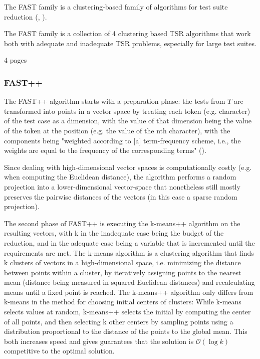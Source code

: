 The FAST family is a clustering-based family of algorithms for test
suite reduction (\cite{miranda2018fast}, \cite{cruciani2019scalable}).

The FAST family is a collection of 4 clustering based TSR algorithms
that work both with adequate and inadequate TSR problems, especially
for large test suites.

4 pages

\subsubsection{FAST++}


The FAST++ algorithm starts with a preparation phase: the tests from $T$
are transformed into points in a vector space by treating each token
(e.g. character) of the test case as a dimension, with the value of that
dimension being the value of the token at the position (e.g. the value
of the nth character), with the components being "weighted according to
[a] term-frequency scheme, i.e., the weights are equal to the frequency
of the corresponding terms" (\cite{cruciani2019scalable}).

Since dealing with high-dimensional vector spaces is computationally
costly (e.g. when computing the Euclidean distance), the algorithm
performs a random projection into a lower-dimensional vector-space that
nonetheless still mostly preserves the pairwise distances of the vectors
(in this case a sparse random projection).

The second phase of FAST++ is executing the k-means++ algorithm %
on the resulting vectors, with k in the inadequate case being the
budget of the reduction, and in the adequate case being a variable
that is incremented until the requirements are met. The k-means
algorithm is a clustering algorithm that finds k clusters of vectors in a
high-dimensional space, i.e. minimizing the distance between points within
a cluster, by iteratively assigning points to the nearest mean (distance
being measured in squared Euclidean distances) and recalculating means
until a fixed point is reached. The k-means++ algorithm only differs
from k-means in the method for choosing initial centers of clusters:
While k-means selects values at random, k-means++ selects the initial by
computing the center of all points, and then selecting k other centers by
sampling points using a distribution proportional to the distance of the
points to the global mean. This both increases speed %
and gives guarantees that the solution is $\mathcal{O}(\log k)$ competitive
to the optimal solution. %

